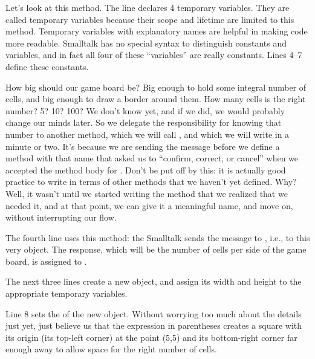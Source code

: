 \documentclass[a4paper,10pt,twoside]{book}
\begin{document}
Let's look at this  method.
The line   declares 4 temporary variables. They are called temporary variables because their scope and lifetime are limited to this method.  Temporary variables with explanatory names are helpful in making code more readable.  Smalltalk has no special syntax to distinguish constants and variables, and in fact all four of these ``variables'' are really constants. 
Lines 4--7 define these constants.

How big should our game board be?  Big enough to hold some integral number of cells, and big enough to draw a border around them.
How many cells is the right number?  5? 10? 100? We don't know yet, and if we did, we would probably change our minds later.  So we delegate the responsibility for knowing that number to another method, which we will call , and which we will write in a minute or two.
It's because we are sending the  message before we define a method with that name that \squeak asked us to ``confirm, correct, or cancel'' when we accepted the method body for .
Don't be put off by this: it is actually good practice to write in terms of other methods that we haven't yet defined.
Why?  Well, it wasn't until we started writing the  method that we realized that we needed it, and at that point, we can give it a meaningful name, and move on, without interrupting our flow.
 
The fourth line uses this method: 
the Smalltalk  sends the message  to , i.e., to this very object.  
The response, which will be the number of cells per side of the game board, is assigned to .

The next three lines create a new  object, and assign its width and height to the appropriate temporary variables. 

Line 8 sets the  of the new object.
Without worrying too much about the details just yet, just believe us that the expression in parentheses creates a square with its origin (\ie its top-left corner) at the point (5,5) and its bottom-right corner far enough away to allow space for the right number of cells.
\end{document}
